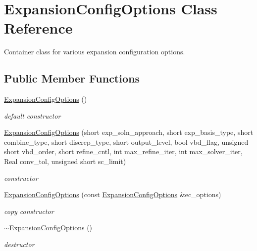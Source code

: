 \section{Expansion\+Config\+Options Class Reference}
\label{classPecos_1_1ExpansionConfigOptions}


Container class for various expansion configuration options.  


\subsection*{Public Member Functions}
\begin{DoxyCompactItemize}
\item 
\hyperlink{classPecos_1_1ExpansionConfigOptions_a0f799f4b0d6b136850a3f8dcffa92d0e}{Expansion\+Config\+Options} ()\label{classPecos_1_1ExpansionConfigOptions_a0f799f4b0d6b136850a3f8dcffa92d0e}

\begin{DoxyCompactList}\small\item\em default constructor \end{DoxyCompactList}\item 
\hyperlink{classPecos_1_1ExpansionConfigOptions_af12f42d383b2952656d1738710545660}{Expansion\+Config\+Options} (short exp\+\_\+soln\+\_\+approach, short exp\+\_\+basis\+\_\+type, short combine\+\_\+type, short discrep\+\_\+type, short output\+\_\+level, bool vbd\+\_\+flag, unsigned short vbd\+\_\+order, short refine\+\_\+cntl, int max\+\_\+refine\+\_\+iter, int max\+\_\+solver\+\_\+iter, Real conv\+\_\+tol, unsigned short sc\+\_\+limit)\label{classPecos_1_1ExpansionConfigOptions_af12f42d383b2952656d1738710545660}

\begin{DoxyCompactList}\small\item\em constructor \end{DoxyCompactList}\item 
\hyperlink{classPecos_1_1ExpansionConfigOptions_af383162dc15e844eceeb8d8839a80f76}{Expansion\+Config\+Options} (const \hyperlink{classPecos_1_1ExpansionConfigOptions}{Expansion\+Config\+Options} \&ec\+\_\+options)\label{classPecos_1_1ExpansionConfigOptions_af383162dc15e844eceeb8d8839a80f76}

\begin{DoxyCompactList}\small\item\em copy constructor \end{DoxyCompactList}\item 
\hyperlink{classPecos_1_1ExpansionConfigOptions_adcd10ff74da8317dd2f68fd4dc7a8980}{$\sim$\+Expansion\+Config\+Options} ()\label{classPecos_1_1ExpansionConfigOptions_adcd10ff74da8317dd2f68fd4dc7a8980}

\begin{DoxyCompactList}\small\item\em destructor \end{DoxyCompactList}\end{DoxyCompactItemize}
